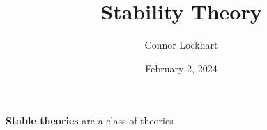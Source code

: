 \documentclass[a4paper]{article}
\title{Stability Theory}
\date{February 2, 2024}
\author{Connor Lockhart}
\begin{document}
\maketitle
\par{\textbf{Stable theories} are a class of theories }
\printbibliography
\end{document}
